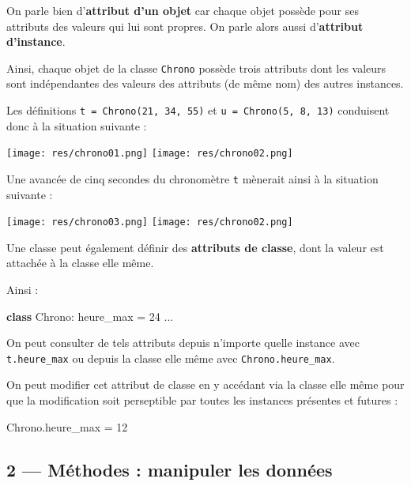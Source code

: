 \documentclass[a4paper,17pt]{extarticle}
\newenvironment{Shaded}{}{}
\newcommand{\KeywordTok}[1]{\textcolor[rgb]{0.00,0.44,0.13}{\textbf{{#1}}}}
\newcommand{\DecValTok}[1]{\textcolor[rgb]{0.25,0.63,0.44}{{#1}}}
\newcommand{\NormalTok}[1]{{#1}}
\newcommand{\OperatorTok}[1]{\textcolor[rgb]{0.40,0.40,0.40}{{#1}}}
\begin{document}
\begin{retenir}
    On parle bien d'\textbf{attribut d'un objet} car chaque objet possède
pour ses attributs des valeurs qui lui sont propres. On parle alors
aussi d'\textbf{attribut d'instance}.

        \end{retenir}\begin{exemple}
    Ainsi, chaque objet de la classe \texttt{Chrono} possède trois attributs
dont les valeurs sont indépendantes des valeurs des attributs (de même
nom) des autres instances.

Les définitions \texttt{t\ =\ Chrono(21,\ 34,\ 55)} et
\texttt{u\ =\ Chrono(5,\ 8,\ 13)} conduisent donc à la situation
suivante :

\texttt{[image: res/chrono01.png]} \texttt{[image: res/chrono02.png]}

Une avancée de cinq secondes du chronomètre \texttt{t} mènerait ainsi à
la situation suivante :

\texttt{[image: res/chrono03.png]} \texttt{[image: res/chrono02.png]}

        \end{exemple}\begin{retenir}
    Une classe peut également définir des \textbf{attributs de classe}, dont
la valeur est attachée à la classe elle même.

        \end{retenir}\begin{exemple}
    Ainsi :

\begin{Shaded}
\begin{Highlighting}[]
\KeywordTok{class}\NormalTok{ Chrono:}
\NormalTok{    heure\_max }\OperatorTok{=} \DecValTok{24}
\NormalTok{    ...}
\end{Highlighting}
\end{Shaded}

On peut consulter de tels attributs depuis n'importe quelle instance
avec \texttt{t.heure\_max} ou depuis la classe elle même avec
\texttt{Chrono.heure\_max}.

On peut modifier cet attribut de classe en y accédant via la classe elle
même pour que la modification soit perseptible par toutes les instances
présentes et futures :

\begin{Shaded}
\begin{Highlighting}[]
\NormalTok{Chrono.heure\_max }\OperatorTok{=} \DecValTok{12}
\end{Highlighting}
\end{Shaded}

        \end{exemple}
    \hypertarget{muxe9thodes-manipuler-les-donnuxe9es}{%
\subsection{2 --- Méthodes : manipuler les
données}\label{muxe9thodes-manipuler-les-donnuxe9es}}
\end{document}
